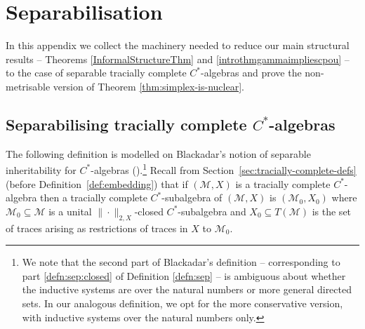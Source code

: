 \documentclass[a4paper,11pt]{amsart}
\theoremstyle{definition}
\numberwithin{equation}{section}
\numberwithin{theorem}{section}
\newcommand{\M}{\mathcal{M}}
\begin{document}
\appendix

\section{Separabilisation}\label{sec:sep}

In this appendix we collect the machinery needed to reduce our main structural results -- Theorems \ref{InformalStructureThm} and \ref{introthmgammaimpliescpou} -- to the case of separable tracially complete $C^*$-algebras and prove the non-metrisable version of Theorem \ref{thm:simplex-is-nuclear}.



\subsection{Separabilising tracially complete \texorpdfstring{$C^*$}{C*}-algebras}

The following definition is modelled on Blackadar's notion of separable inheritability for $C^*$-algebras (\cite[Section II.8.5]{Bl06}).\footnote{We note that the second part of Blackadar's definition -- corresponding to part \ref{defn:sep:closed} of Definition \ref{defn:sep} -- is ambiguous about whether the inductive systems are over the natural numbers or more general directed sets. In our analogous definition, we opt for the more conservative version, with inductive systems over the natural numbers only.}  Recall from Section~\ref{sec:tracially-complete-defs} (before Definition~\ref{def:embedding}) that if $(\M, X)$ is a tracially complete $C^*$-algebra then a tracially complete $C^*$-subalgebra of $(\M, X)$ is $(\M_0,X_0)$ where $\M_0 \subseteq \M$ is a unital $\|\cdot\|_{2, X}$-closed $C^*$-subalgebra and $X_0 \subseteq T(\M)$ is the set of traces arising as restrictions of traces in $X$ to $\M_0$.
\end{document}
